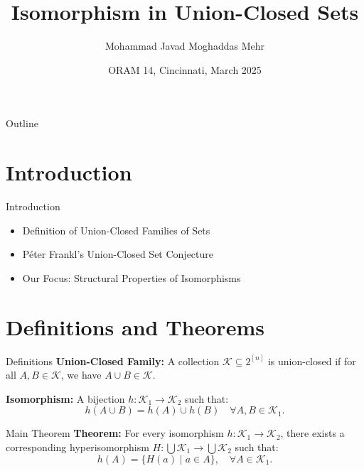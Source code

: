 \documentclass{beamer}
\title{Isomorphism in Union-Closed Sets}
\author{Mohammad Javad Moghaddas Mehr}
\date{ORAM 14, Cincinnati, March 2025}
\begin{document}
\begin{frame}
    \titlepage
\end{frame}

\begin{frame}{Outline}
    \tableofcontents
\end{frame}

\section{Introduction}
\begin{frame}{Introduction}
    \begin{itemize}
        \item Definition of Union-Closed Families of Sets
        \item Péter Frankl's Union-Closed Set Conjecture
        \item Our Focus: Structural Properties of Isomorphisms
    \end{itemize}
\end{frame}

\section{Definitions and Theorems}
\begin{frame}{Definitions}
    \textbf{Union-Closed Family:} A collection $\mathcal{K} \subseteq 2^{[n]}$ is union-closed if for all $A, B \in \mathcal{K}$, we have $A \cup B \in \mathcal{K}$.

    \vspace{1em}
    \textbf{Isomorphism:} A bijection $h: \mathcal{K}_1 \to \mathcal{K}_2$ such that:
    \begin{equation*}
        h(A \cup B) = h(A) \cup h(B) \quad \forall A, B \in \mathcal{K}_1.
    \end{equation*}
\end{frame}

\begin{frame}{Main Theorem}
    \textbf{Theorem:} For every isomorphism $h: \mathcal{K}_1 \to \mathcal{K}_2$, there exists a corresponding hyperisomorphism $H: \bigcup \mathcal{K}_1 \to \bigcup \mathcal{K}_2$ such that:
    \begin{equation*}
        h(A) = \{H(a) \mid a \in A\}, \quad \forall A \in \mathcal{K}_1.
    \end{equation*}
\end{frame}
\end{document}
